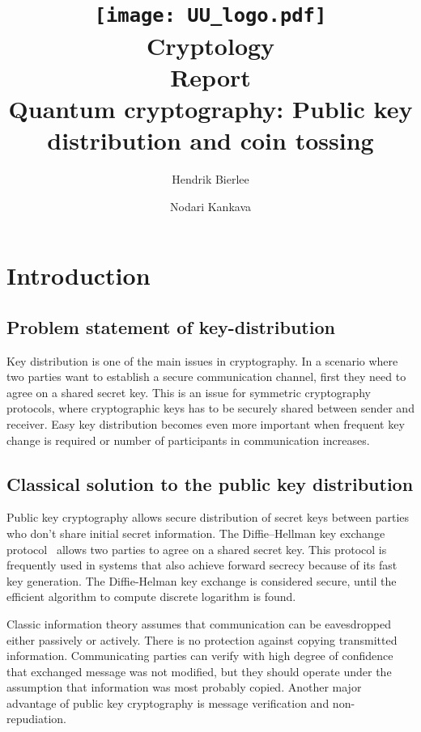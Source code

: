 \documentclass[oneside,a4paper]{article}
\title {
	\texttt{[image: UU\_logo.pdf]}\\[1em]
	Cryptology \\
	Report\\[1em]
	Quantum cryptography: Public key distribution and coin tossing
}
\author{
		Hendrik Bierlee \and
		Nodari Kankava
}
\begin{document}
\maketitle
\thispagestyle{empty} %
\pagebreak

\setcounter{qcounter}{1}
\newcommand{\question}[1]{\par\vspace{10px}\noindent\textbf{Question \theqcounter \stepcounter{qcounter}:} \emph{#1}\vspace{0.5em}\\\noindent}


\section{Introduction}


\subsection{Problem statement of key-distribution} \label{sec:key-dist-problem}
Key distribution is one of the main issues in cryptography. In a scenario where two parties want to establish a secure communication channel, first they need to agree on a shared secret key. This is an issue for symmetric cryptography protocols, where cryptographic keys has to be securely shared between sender and receiver. Easy key distribution becomes even more important when frequent key change is required or number of participants in communication increases.

\subsection{Classical solution to the public key distribution}
Public key cryptography allows secure distribution of secret keys between parties who don't share initial secret information. The Diffie–Hellman key exchange protocol~\cite{diffie1976new} allows two parties to agree on a shared secret key. This protocol is frequently used in systems that also achieve forward secrecy because of its fast key generation. The Diffie-Helman key exchange is considered secure, until the efficient algorithm to compute discrete logarithm is found.


Classic information theory assumes that communication can be eavesdropped either passively or actively. There is no protection against copying transmitted information. Communicating parties can verify with high degree of confidence that exchanged message was not modified, but they should operate under the assumption that information was most probably copied.
Another major advantage of public key cryptography is message verification and non-repudiation.
\end{document}
